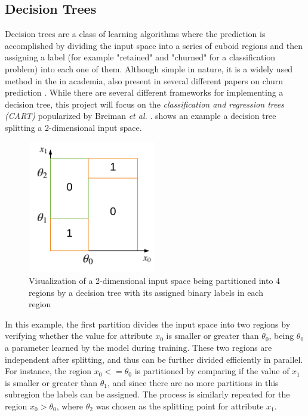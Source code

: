 \documentclass{kththesis}
\begin{document}
\subsection{Decision Trees}
Decision trees are a class of learning algorithms where the prediction is accomplished by dividing the input space into a series of cuboid regions and then assigning a label (for example "retained" and "churned" for a classification problem) into each one of them. Although simple in nature, it is a widely used method in the in academia, also present in several different papers on churn prediction \citep{Pudipeddi2014}\citep{Hassouna2015} \citep{Ballings2012} \citep{Khan2015}. While there are several different frameworks for implementing a decision tree, this project will focus on the \emph{classification and regression trees (CART)} popularized by Breiman \emph{et al.} \citep{breiman1984classification}.  shows an example a decision tree splitting a 2-dimensional input space.  

\begin{figure}[h]
    \centering
    \includegraphics[width=0.5\textwidth,keepaspectratio]{figures/dectree.pdf}
    \caption{Visualization of a 2-dimensional input space being partitioned into 4 regions by a decision tree with its assigned binary labels in each region}
    \label{fig:dectree}
\end{figure}

In this example, the first partition divides the input space into two regions by verifying whether the value for attribute $x_0$ is smaller or greater than $\theta_0$, being $\theta_0$ a parameter learned by the model during training. These two regions are independent after splitting, and thus can be further divided efficiently in parallel. For instance, the region $x_0 <= \theta_0$ is partitioned by comparing if the value of $x_1$ is smaller or greater than $\theta_1$, and since there are no more partitions in this subregion the labels can be assigned. The process is similarly repeated for the region  $x_0 > \theta_0$, where $\theta_2$ was chosen as the splitting point for attribute $x_1$.
 
\end{document}

